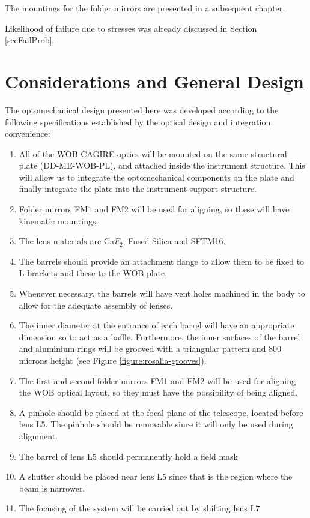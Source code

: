 \documentclass{report}
\begin{document}
The mountings for the folder mirrors are presented in a subsequent chapter.

Likelihood of failure due to stresses was already discussed in Section \ref{secFailProb}.

\section{Considerations and General Design}

The optomechanical design presented here was developed according to the following specifications established by the optical design and integration convenience:
\begin{enumerate}
\item All of the WOB CAGIRE optics will be mounted on the same structural plate (DD-ME-WOB-PL), and attached inside the instrument structure. This will allow us to integrate the optomechanical components on the plate and finally integrate the plate into the instrument support structure. 
\item Folder mirrors FM1 and FM2 will be used for aligning, so these will have kinematic mountings. 
\item The lens materials are Ca$F_2$, Fused Silica and SFTM16.
\item The barrels should provide an attachment flange to allow them to be fixed to L-brackets and these to the WOB plate.
\item Whenever necessary, the barrels will have vent holes machined in the body to allow for the adequate assembly of lenses.
\item The inner diameter at the entrance of each barrel will have an appropriate dimension so to act as a baffle. Furthermore, the inner surfaces of the barrel and aluminium rings will be grooved with a triangular pattern and 800 microns height (see Figure \ref{figure:rosalia-grooves}).
\item The first and second folder-mirrors FM1 and FM2 will be used for aligning the WOB optical layout, so they must have the possibility of being aligned.
\item A pinhole should be placed at the focal plane of the telescope, located before lens L5. The pinhole should be removable since it will only be used during alignment.
\item The barrel of lens L5 should permanently hold a field mask 
\item A shutter should be placed near lens L5 since that is the region where the beam is narrower.
\item The focusing of the system will be carried out by shifting lens L7 

\end{enumerate}
\end{document}
